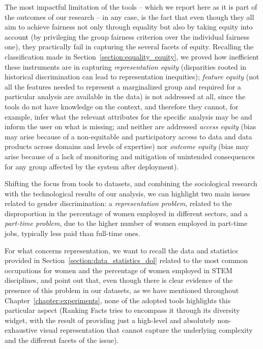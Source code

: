 The most impactful limitation of the tools -- which we report here as it is part of the outcomes of our research -- in any case, is the fact that even though they all aim to achieve fairness not only through equality but also by taking equity into account (by privileging the group fairness criterion over the individual fairness one), they practically fail in capturing the several facets of equity. Recalling the classification made in Section~\ref{section:equality_equity}, we proved how inefficient these instruments are in capturing \textit{representation equity} (disparities rooted in historical discrimination can lead to representation inequities); \textit{feature equity} (not all the features needed to represent a marginalized group and required for a particular analysis are available in the data) is not addressed at all, since the tools do not have knowledge on the context, and therefore they cannot, for example, infer what the relevant attributes for the specific analysis may be and inform the user on what is missing; and neither are addressed \textit{access equity} (bias may arise because of a non-equitable and participatory access to data and data products across domains and levels of expertise) nor \textit{outcome equity} (bias may arise because of a lack of monitoring and mitigation of unintended consequences for any group affected by the system after deployment).

Shifting the focus from tools to datasets, and combining the sociological research with the technological results of our analysis, we can highlight two main issues related to gender discrimination: a \textit{representation problem}, related to the disproportion in the percentage of women employed in different sectors, and a \textit{part-time problem}, due to the higher number of women employed in part-time jobs, typically less paid than full-time ones.

For what concerns representation, we want to recall the data and statistics provided in Section~\ref{section:data_statistics_dol} related to the most common occupations for women and the percentage of women employed in STEM disciplines, and point out that, even though there is clear evidence of the presence of this problem in our datasets, as we have mentioned throughout Chapter~\ref{chapter:experiments}, none of the adopted tools highlights this particular aspect (Ranking Facts tries to encompass it through its diversity widget, with the result of providing just a high-level and absolutely non-exhaustive visual representation that cannot capture the underlying complexity and the different facets of the issue).

